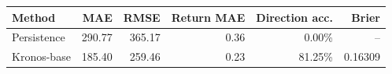 \begin{tabular}{lrrrrr}
\toprule
Method & MAE & RMSE & Return MAE & Direction acc. & Brier \\
\midrule
Persistence & 290.77 & 365.17 & 0.36 & 0.00\% & -- \\
Kronos-base & 185.40 & 259.46 & 0.23 & 81.25\% & 0.16309 \\
\bottomrule
\end{tabular}
